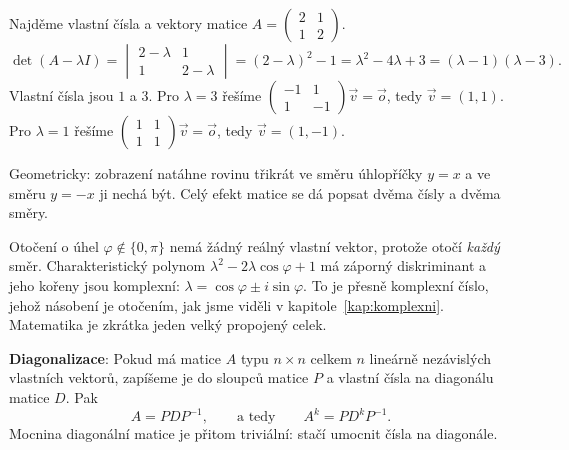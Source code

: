 \begin{example}
  Najděme vlastní čísla a vektory matice $A = \begin{pmatrix} 2 & 1\\ 1 & 2\end{pmatrix}$.
  \begin{equation*}
    \det(A - \lambda I) = \begin{vmatrix} 2 - \lambda & 1\\ 1 & 2 - \lambda\end{vmatrix} = {(2 - \lambda)}^2 - 1 = \lambda^2 - 4\lambda + 3 = (\lambda - 1)(\lambda - 3).
  \end{equation*}
  Vlastní čísla jsou $1$ a $3$. Pro $\lambda = 3$ řešíme $\begin{pmatrix}-1 & 1\\ 1 & -1\end{pmatrix}\vec{v} = \vec{o}$, tedy $\vec{v} = (1, 1)$. Pro $\lambda = 1$ řešíme $\begin{pmatrix}1 & 1\\ 1 & 1\end{pmatrix}\vec{v} = \vec{o}$, tedy $\vec{v} = (1, -1)$.

  Geometricky: zobrazení natáhne rovinu třikrát ve směru úhlopříčky $y = x$ a ve směru $y = -x$ ji nechá být. Celý efekt matice se dá popsat dvěma čísly a dvěma směry.
\end{example}

\begin{example}
  Otočení o úhel $\varphi\notin\{0, \pi\}$ nemá žádný reálný vlastní vektor, protože otočí \textit{každý} směr. Charakteristický polynom $\lambda^2 - 2\lambda\cos\varphi + 1$ má záporný diskriminant a jeho kořeny jsou komplexní: $\lambda = \cos\varphi\pm i\sin\varphi$. To je přesně komplexní číslo, jehož násobení je otočením, jak jsme viděli v kapitole~\ref{kap:komplexni}. Matematika je zkrátka jeden velký propojený celek.
\end{example}

\begin{definitionbox}
  \textbf{Diagonalizace}: Pokud má matice $A$ typu $n\times n$ celkem $n$ lineárně nezávislých vlastních vektorů, zapíšeme je do sloupců matice $P$ a vlastní čísla na diagonálu matice $D$. Pak
  \begin{equation*}
    A = PDP^{-1},\qquad\text{a tedy}\qquad A^k = PD^kP^{-1}.
  \end{equation*}
  Mocnina diagonální matice je přitom triviální: stačí umocnit čísla na diagonále.
\end{definitionbox}

